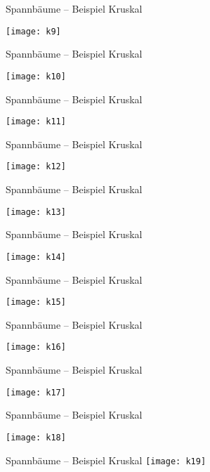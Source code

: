 \begin{frame}{Spannbäume – Beispiel Kruskal}
	
		\centering
		\texttt{[image: k9]}
	
\end{frame}

\begin{frame}{Spannbäume – Beispiel Kruskal}
	
		\centering
		\texttt{[image: k10]}
	
\end{frame}

\begin{frame}{Spannbäume – Beispiel Kruskal}
	
		\centering
		\texttt{[image: k11]}
	
\end{frame}

\begin{frame}{Spannbäume – Beispiel Kruskal}
	
		\centering
		\texttt{[image: k12]}
	
\end{frame}

\begin{frame}{Spannbäume – Beispiel Kruskal}
	
		\centering
		\texttt{[image: k13]}
	
\end{frame}

\begin{frame}{Spannbäume – Beispiel Kruskal}
	
		\centering
		\texttt{[image: k14]}
	
\end{frame}

\begin{frame}{Spannbäume – Beispiel Kruskal}
	
		\centering
		\texttt{[image: k15]}
	
\end{frame}

\begin{frame}{Spannbäume – Beispiel Kruskal}
	
		\centering
		\texttt{[image: k16]}
	
\end{frame}

\begin{frame}{Spannbäume – Beispiel Kruskal}
	
		\centering
		\texttt{[image: k17]}
	
\end{frame}

\begin{frame}{Spannbäume – Beispiel Kruskal}
	
		\centering
		\texttt{[image: k18]}
	
\end{frame}

\begin{frame}{\hypertarget{label:afterEx2}{}Spannbäume – Beispiel Kruskal}
		\centering
		\texttt{[image: k19]}
\end{frame}
